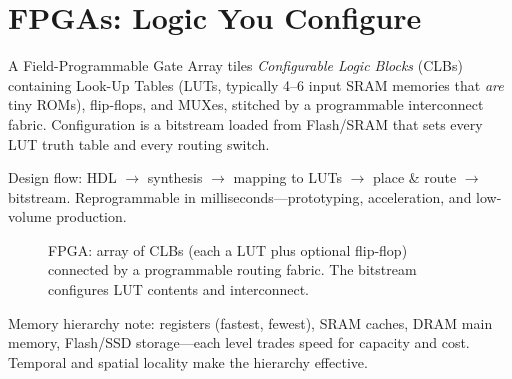 \section{FPGAs: Logic You Configure}
\label{sec:fpga}
A Field-Programmable Gate Array tiles \emph{Configurable Logic Blocks} (CLBs) containing
Look-Up Tables (LUTs, typically 4--6 input SRAM memories that \emph{are} tiny ROMs), flip-flops,
and MUXes, stitched by a programmable interconnect fabric. Configuration is a bitstream loaded
from Flash/SRAM that sets every LUT truth table and every routing switch.

Design flow: HDL $\to$ synthesis $\to$ mapping to LUTs $\to$ place \& route $\to$ bitstream.
Reprogrammable in milliseconds---prototyping, acceleration, and low-volume production.

\begin{figure}[h]
\centering
{}
\caption{FPGA: array of CLBs (each a LUT plus optional flip-flop) connected by a programmable routing fabric. The bitstream configures LUT contents and interconnect.}
\label{fig:fpga}
\end{figure}

Memory hierarchy note: registers (fastest, fewest), SRAM caches, DRAM main memory, Flash/SSD storage---each level trades speed for capacity and cost. Temporal and spatial locality make the hierarchy effective.


